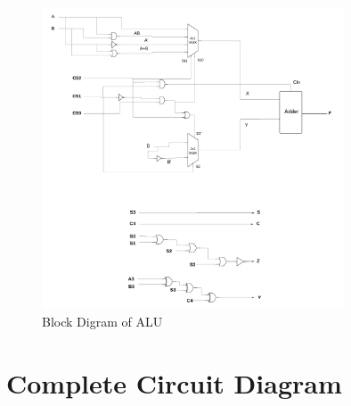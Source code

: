 \documentclass[11pt]{article}
\begin{document}
\vspace{5mm}
\begin{figure}[H]
    \centering
    \includegraphics[width=0.8\textwidth]{images/Blank diagram.png}
    \caption{ Block Digram of ALU }
    \label{fig:enter-label}
\end{figure}

\newpage
\section{Complete Circuit Diagram}
\end{document}
